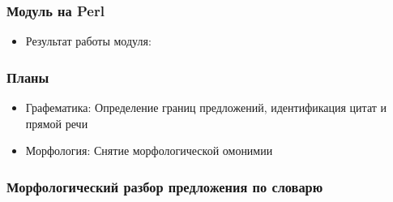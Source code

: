 \documentclass{beamer}
\begin{document}
\begin{frame}
\frametitle{Модуль на Perl}
\begin{itemize}
\item{Результат работы модуля:}
\begin{figure}
\end{figure}
\end{itemize}
\end{frame}

\begin{frame}
\frametitle{Планы}
\begin{itemize}
\item{Графематика: Определение границ предложений, идентификация цитат и прямой речи}
\pause
\item{Морфология: Снятие морфологической омонимии}
\end{itemize}
\end{frame}

\begin{frame}
\frametitle{Морфологический разбор предложения по словарю}
\begin{figure}
\end{figure}
\end{frame}
\end{document}
